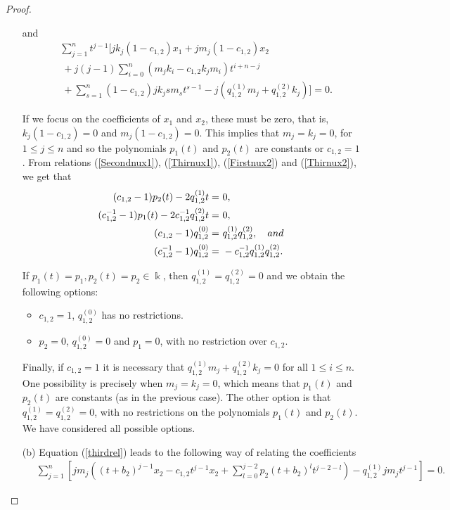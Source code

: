 \documentclass{amsart}
\theoremstyle{definition}
\theoremstyle{remark}
\numberwithin{equation}{section}
\begin{document}
\begin{proof}
\begin{enumerate}
    and 
     \begin{align*}
        &\ \sum_{j=1}^nt^{j-1} [jk_j(1-c_{1,2})x_1+jm_j(1-c_{1,2})x_2 \\
        &\ \ + j(j-1)\sum_{i=0}^n\left(m_jk_i-c_{1,2}k_jm_i\right)t^{i+n-j} \\
        &\ \ + \sum_{s=1}^{n}(1-c_{1,2})jk_jsm_st^{s-1}-j(q_{1,2}^{(1)}m_j+q_{1,2}^{(2)}k_j) ]=0.
    \end{align*}
    
    If we focus on the coefficients of $x_1$ and $x_2$, these must be zero, that is, $k_j(1-c_{1,2}) = 0$ and $m_j(1-c_{1,2}) = 0$. This implies that $m_j=k_j=0$, for $1 \leq j \leq n$ and so the polynomials $p_1(t)$ and $p_2(t)$ are constants or $c_{1,2}=1$. From relations {\rm (}\ref{Secondnux1}{\rm )}, {\rm (}\ref{Thirnux1}{\rm )}, {\rm (}\ref{Firstnux2}{\rm )} and  {\rm (}\ref{Thirnux2}{\rm )}, we get that
    \begin{align*}
        (c_{1,2}-1)p_2(t)-2q_{1,2}^{(1)}t = &\ 0,\\(c_{1,2}^{-1}-1)p_1(t)-2c_{1,2}^{-1}q_{1,2}^{(2)}t = &\ 0, \\
        (c_{1,2}-1)q_{1,2}^{(0)} = &\ q_{1,2}^{(1)}q_{1,2}^{(2)}, \quad{\rm and} \\ (c_{1,2}^{-1}-1)q_{1,2}^{(0)} = &\ -c_{1,2}^{-1}q_{1,2}^{(1)}q_{1,2}^{(2)}.
    \end{align*}

    If $p_1(t) = p_1, p_2(t)=p_2 \in \Bbbk$, then $q_{1,2}^{(1)}=q_{1,2}^{(2)}=0$  and we obtain the following options:
    \begin{itemize}
        \item $c_{1,2}=1$, $q_{1,2}^{(0)}$ has no restrictions.
        
        \item $p_2=0$, $q_{1,2}^{(0)}=0$ and $p_1=0$, with no restriction over $c_{1,2}$.
    \end{itemize}
    
    Finally, if $c_{1,2}=1$ it is necessary that $q_{1,2}^{(1)}m_j+q_{1,2}^{(2)}k_j=0$ for all $1 \leq i \leq n$. One possibility is precisely when $m_j=k_j=0$, which means that $p_1(t)$ and $p_2(t)$ are constants (as in the previous case). The other option is that $q_{1,2}^{(1)}=q_{1,2}^{(2)}=0$, with no restrictions on the polynomials $p_1(t)$ and $p_2(t)$. We have considered all possible options.
    
    \item [\rm (b)] Equation (\ref{thirdrel}) leads to the following way of relating the coefficients
    {\small{
    \begin{align*}
        &\ \sum_{j=1}^n\left[jm_j\left(\left(t+b_2\right)^{j-1}x_2-c_{1,2}t^{j-1}x_2 +\sum_{l=0}^{j-2}p_2(t+b_2)^{l}t^{j-2-l}\right)-q_{1,2}^{(1)}jm_jt^{j-1}\right] = 0.
    \end{align*}
    }}
    

\end{enumerate}
\end{proof}
\end{document}
